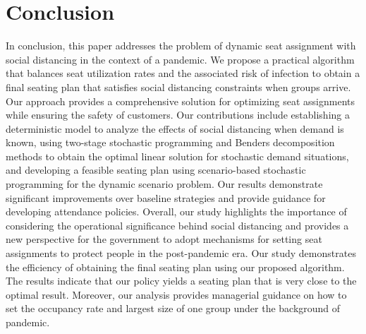 \section{Conclusion}
In conclusion, this paper addresses the problem of dynamic seat assignment with social distancing in the context of a pandemic. We propose a practical algorithm that balances seat utilization rates and the associated risk of infection to obtain a final seating plan that satisfies social distancing constraints when groups arrive. Our approach provides a comprehensive solution for optimizing seat assignments while ensuring the safety of customers. Our contributions include establishing a deterministic model to analyze the effects of social distancing when demand is known, using two-stage stochastic programming and Benders decomposition methods to obtain the optimal linear solution for stochastic demand situations, and developing a feasible seating plan using scenario-based stochastic programming for the dynamic scenario problem. Our results demonstrate significant improvements over baseline strategies and provide guidance for developing attendance policies. Overall, our study highlights the importance of considering the operational significance behind social distancing and provides a new perspective for the government to adopt mechanisms for setting seat assignments to protect people in the post-pandemic era. Our study demonstrates the efficiency of obtaining the final seating plan using our proposed algorithm. The results indicate that our policy yields a seating plan that is very close to the optimal result. Moreover, our analysis provides managerial guidance on how to set the occupancy rate and largest size of one group under the background of pandemic.



